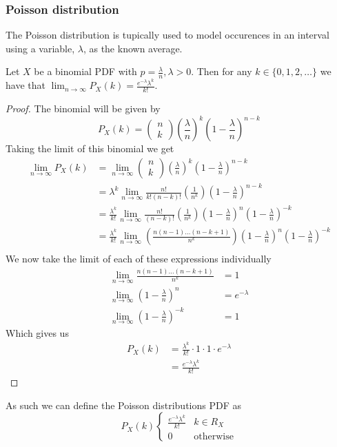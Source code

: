 \subsubsection{Poisson distribution}
The Poisson distribution is tupically used to model occurences in an interval using a variable, $\lambda$, as the known average.
\begin{theorem}
    Let $X$ be a binomial PDF with $p=\frac{\lambda}{n},\lambda>0$. Then for any $k\in\{0,1,2,\ldots\}$ we have that $\lim_{n\rightarrow\infty}P_{X}(k)=\frac{e^{-\lambda}\lambda^{k}}{k!}$.
\end{theorem}
\begin{proof}
  The binomial will be given by
  \[
    P_{X}(k)=\begin{pmatrix}n\\k\end{pmatrix}\left(\frac{\lambda}{n}\right)^{k}\left(1-\frac{\lambda}{n}\right)^{n-k}
  \]
  Taking the limit of this binomial we get
  \begin{align*}
      \lim_{n\rightarrow\infty}P_{X}(k)&=\lim_{n\rightarrow\infty}\begin{pmatrix}n\\k\end{pmatrix}\left(\frac{\lambda}{n}\right)^{k}\left(1-\frac{\lambda}{n}\right)^{n-k} \\
                        &=\lambda^{k}\lim_{n\rightarrow\infty}\frac{n!}{k!(n-k)!}\left(\frac{1}{n^{k}}\right)\left(1-\frac{\lambda}{n}\right)^{n-k} \\
                        &=\frac{\lambda^{k}}{k!}\lim_{n\rightarrow\infty}\frac{n!}{(n-k)!}\left(\frac{1}{n^{k}}\right)\left(1-\frac{\lambda}{n}\right)^{n}\left(1-\frac{\lambda}{n}\right)^{-k} \\
                        &=\frac{\lambda^{k}}{k!}\lim_{n\rightarrow\infty}\left(\frac{n(n-1)\ldots(n-k+1)}{n^{k}}\right)\left(1-\frac{\lambda}{n}\right)^{n}\left(1-\frac{\lambda}{n}\right)^{-k} \\
  \end{align*}
  We now take the limit of each of these expressions individually
  \begin{align*}
      \lim_{n\rightarrow\infty}\frac{n(n-1)\ldots(n-k+1)}{n^{k}}&=1 \\
      \lim_{n\rightarrow\infty}\left(1-\frac{\lambda}{n}\right)^{n}&=e^{-\lambda} \\
      \lim_{n\rightarrow\infty}\left(1-\frac{\lambda}{n}\right)^{-k}&=1 
  \end{align*}
  Which gives us
  \begin{align*}
      P_{X}(k)&=\frac{\lambda^{k}}{k!}\cdot 1\cdot 1\cdot e^{-\lambda} \\
              &=\frac{e^{-\lambda}\lambda^{k}}{k!}
  \end{align*}
\end{proof}
As such we can define the Poisson distributions PDF as
\[
    P_{X}(k)\begin{cases}\frac{e^{-\lambda}\lambda^{k}}{k!} & k\in R_X \\ 0 & \text{otherwise}\end{cases}
\]
